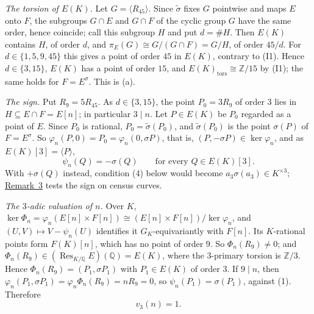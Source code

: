 \documentclass[11pt]{article}
\newcommand{\Q}{\mathbb Q}
\newcommand{\Z}{\mathbb Z}
\DeclareMathOperator{\Res}{Res}
\begin{document}
\emph{The torsion of \(E(K)\).} Let \(G=\langle R_{45}\rangle\). Since \(\tilde\sigma\) fixes \(G\)
pointwise and maps \(E\) onto \(F\), the subgroups \(G\cap E\) and \(G\cap F\) of the cyclic group
\(G\) have the same order, hence coincide; call this subgroup \(H\) and put \(d=\#H\). Then \(E(K)\)
contains \(H\), of order \(d\), and \(\pi_E(G)\cong G/(G\cap F)=G/H\), of order \(45/d\). For
\(d\in\{1,5,9,45\}\) this gives a point of order \(45\) in \(E(K)\), contrary to (I1). Hence
\(d\in\{3,15\}\), \(E(K)\) has a point of order \(15\), and \(E(K)_{\mathrm{tors}}\cong\Z/15\) by
(I1); the same holds for \(F=E^\sigma\). This is (a).

\emph{The sign.} Put \(R_9=5R_{45}\). As \(d\in\{3,15\}\), the point \(P_0=3R_9\) of order \(3\) lies in
\(H\subseteq E\cap F=E[n]\); in particular \(3\mid n\). Let \(P\in E(K)\) be \(P_0\) regarded as a point
of \(E\). Since \(P_0\) is rational, \(P_0=\tilde\sigma(P_0)\), and \(\tilde\sigma(P_0)\) is the point
\(\sigma(P)\) of \(F=E^\sigma\). So \(\varphi_n(P,0)=P_0=\varphi_n(0,\sigma P)\), that is,
\((P,-\sigma P)\in\ker\varphi_n\), and as \(E(K)[3]=\langle P\rangle\),
\[\psi_n(Q)=-\sigma(Q)\qquad\text{for every }Q\in E(K)[3].\tag{1}\]
With \(+\sigma(Q)\) instead, condition (4) below would become \(a_3\sigma(a_3)\in K^{\times3}\);
\hyperref[rem-census]{Remark~3} tests the sign on census curves.

\emph{The \(3\)-adic valuation of \(n\).} Over \(K\),
\(\ker\Phi_n=\varphi_n(E[n]\times F[n])\cong(E[n]\times F[n])/\ker\varphi_n\), and
\((U,V)\mapsto V-\psi_n(U)\) identifies it \(G_K\)-equivariantly with \(F[n]\). Its \(K\)-rational
points form \(F(K)[n]\), which has no point of order \(9\). So \(\Phi_n(R_9)\neq0\); and
\(\Phi_n(R_9)\in(\Res_{K/\Q}E)(\Q)=E(K)\), where the \(3\)-primary torsion is \(\Z/3\). Hence
\(\Phi_n(R_9)=(P_1,\sigma P_1)\) with \(P_1\in E(K)\) of order \(3\). If \(9\mid n\), then
\(\varphi_n(P_1,\sigma P_1)=\varphi_n\Phi_n(R_9)=nR_9=0\), so \(\psi_n(P_1)=\sigma(P_1)\), against
(1). Therefore
\[v_3(n)=1.\tag{2}\]
\end{document}
